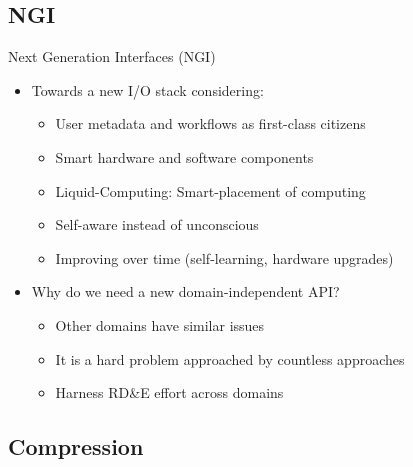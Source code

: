 \documentclass[compress,11pt,xcolor=svgnames,aspectratio=169]{beamer}
\begin{document}
\subsection{NGI}

\begin{frame}[fragile]{Next Generation Interfaces (NGI)}

\begin{itemize}
\setlength\itemsep{0.4cm}

\item Towards a new I/O stack considering:

  \begin{itemize}
  \setlength\itemsep{0.2cm}
    \item User metadata and workflows as first-class citizens
    \item Smart hardware and software components
    \item Liquid-Computing: Smart-placement of computing
    \item Self-aware instead of unconscious
    \item Improving over time (self-learning, hardware upgrades)
  \end{itemize}

\item Why do we need a new domain-independent API?

  \begin{itemize}
  \setlength\itemsep{0.2cm}
    \item Other domains have similar issues
    \item It is a hard problem approached by countless approaches
    \item Harness RD\&E effort across domains
  \end{itemize}

\end{itemize}

\end{frame}

\subsection{Compression}
\end{document}
